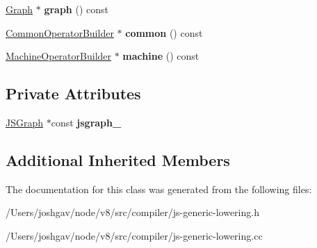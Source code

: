 \begin{DoxyCompactItemize}
\item 
\hyperlink{classv8_1_1internal_1_1compiler_1_1_graph}{Graph} $\ast$ {\bfseries graph} () const \hypertarget{classv8_1_1internal_1_1compiler_1_1_j_s_generic_lowering_ad8e05b9e41f8407add7c89e0d0d4b055}{}\label{classv8_1_1internal_1_1compiler_1_1_j_s_generic_lowering_ad8e05b9e41f8407add7c89e0d0d4b055}

\item 
\hyperlink{classv8_1_1internal_1_1compiler_1_1_common_operator_builder}{Common\+Operator\+Builder} $\ast$ {\bfseries common} () const \hypertarget{classv8_1_1internal_1_1compiler_1_1_j_s_generic_lowering_a664ab2d49c85b2988518d0c19edac5c0}{}\label{classv8_1_1internal_1_1compiler_1_1_j_s_generic_lowering_a664ab2d49c85b2988518d0c19edac5c0}

\item 
\hyperlink{classv8_1_1internal_1_1compiler_1_1_machine_operator_builder}{Machine\+Operator\+Builder} $\ast$ {\bfseries machine} () const \hypertarget{classv8_1_1internal_1_1compiler_1_1_j_s_generic_lowering_ac05c7dc6fd97944ee1c016342728c1ee}{}\label{classv8_1_1internal_1_1compiler_1_1_j_s_generic_lowering_ac05c7dc6fd97944ee1c016342728c1ee}

\end{DoxyCompactItemize}
\subsection*{Private Attributes}
\begin{DoxyCompactItemize}
\item 
\hyperlink{classv8_1_1internal_1_1compiler_1_1_j_s_graph}{J\+S\+Graph} $\ast$const {\bfseries jsgraph\+\_\+}\hypertarget{classv8_1_1internal_1_1compiler_1_1_j_s_generic_lowering_a22cc1117f7d7e1f12720131184d0598e}{}\label{classv8_1_1internal_1_1compiler_1_1_j_s_generic_lowering_a22cc1117f7d7e1f12720131184d0598e}

\end{DoxyCompactItemize}
\subsection*{Additional Inherited Members}


The documentation for this class was generated from the following files\+:\begin{DoxyCompactItemize}
\item 
/\+Users/joshgav/node/v8/src/compiler/js-\/generic-\/lowering.\+h\item 
/\+Users/joshgav/node/v8/src/compiler/js-\/generic-\/lowering.\+cc\end{DoxyCompactItemize}
